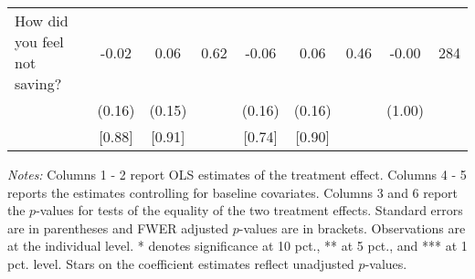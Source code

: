 \begin{table}[htbp]
{\begin{threeparttable}
\begin{tabular}{l*{8}{c}}
How did you feel not saving?&    -0.02&     0.06&     0.62&    -0.06&     0.06&     0.46&    -0.00&      284\\
          &   (0.16)&   (0.15)&         &   (0.16)&   (0.16)&         &   (1.00)&         \\
          &   [0.88]&   [0.91]&         &   [0.74]&   [0.90]&         &         &         \\
\bottomrule \end{tabular} \begin{tablenotes}[flushleft] \footnotesize \item \emph{Notes:} Columns 1 - 2 report OLS estimates of the treatment effect. Columns 4 - 5 reports the estimates controlling for baseline covariates. Columns 3 and 6 report the \(p\)-values for tests of the equality of the two treatment effects. Standard errors are in parentheses and FWER adjusted \(p\)-values are in brackets. Observations are at the individual level. * denotes significance at 10 pct., ** at 5 pct., and *** at 1 pct. level. Stars on the coefficient estimates reflect unadjusted \(p\)-values. \end{tablenotes} \end{threeparttable} } \end{table}

